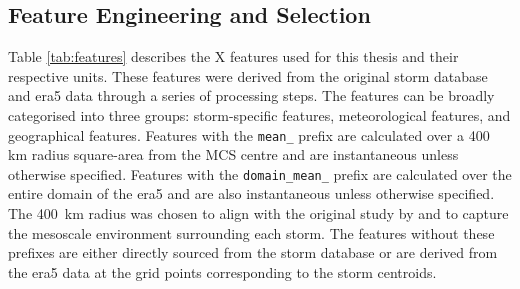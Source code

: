 \subsection{Feature Engineering and Selection}

Table \ref{tab:features} describes the X features used for this thesis and their respective units. These features were derived from the original storm database and \acrshort{era5} data through a series of processing steps. The features can be broadly categorised into three groups: storm-specific features, meteorological features, and geographical features. Features with the \texttt{mean\_} prefix are calculated over a 400 km radius square-area from the MCS centre and are instantaneous unless otherwise specified. Features with the \texttt{domain\_mean\_} prefix are calculated over the entire domain of the \acrshort{era5} and are also instantaneous unless otherwise specified. The \SI{400}{\km} radius was chosen to align with the original study by \cite{Hunt2024} and to capture the mesoscale environment surrounding each storm. The features without these prefixes are either directly sourced from the storm database or are derived from the \acrshort{era5} data at the grid points corresponding to the storm centroids.

